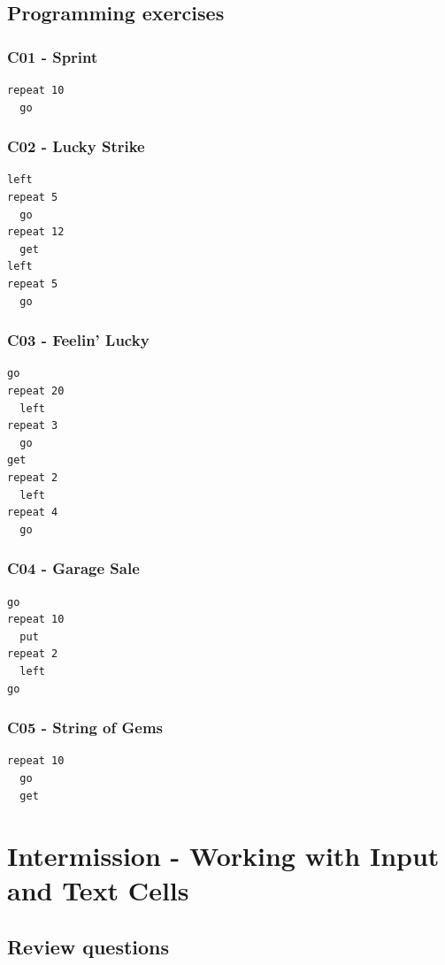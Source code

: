 \documentclass[article,A4,12pt]{llncs}
\begin{document}
\subsection{Programming exercises}

\subsubsection{C01 - Sprint}
\begin{verbatim}
repeat 10
  go
\end{verbatim}

\subsubsection{C02 - Lucky Strike}
\begin{verbatim}
left
repeat 5
  go
repeat 12
  get
left
repeat 5
  go
\end{verbatim}

\subsubsection{C03 - Feelin' Lucky}
\begin{verbatim}
go
repeat 20
  left
repeat 3 
  go
get
repeat 2
  left
repeat 4
  go
\end{verbatim}

\subsubsection{C04 - Garage Sale}
\begin{verbatim}
go
repeat 10
  put
repeat 2
  left
go
\end{verbatim}

\subsubsection{C05 - String of Gems}
\begin{verbatim}
repeat 10
  go
  get
\end{verbatim}


\section{Intermission - Working with Input and Text Cells}

\subsection{Review questions}
\end{document}
